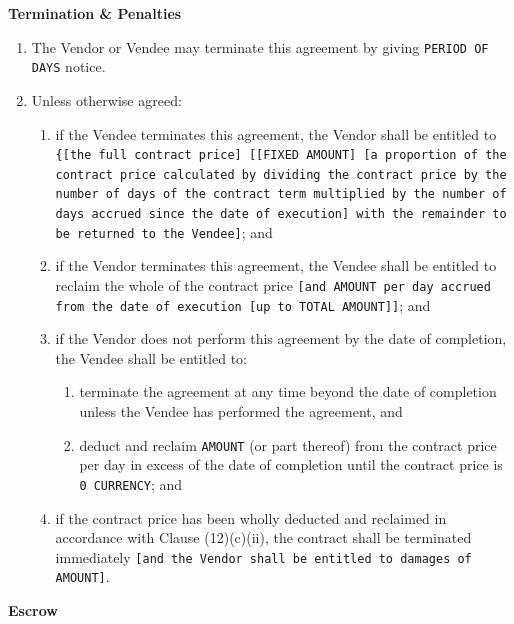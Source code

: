 \documentclass[a4paper,12pt]{article}
\begin{document}
\textbf{Termination \& Penalties}

\begin{enumerate}[resume]
	\item The Vendor or Vendee may terminate this agreement by giving \texttt{\colorbox{branding}{PERIOD OF DAYS}} notice.
	\item Unless otherwise agreed:
	\begin{enumerate}
			\item if the Vendee terminates this agreement, the Vendor shall be entitled to \texttt{\{[the full contract price] [[\texttt{\colorbox{branding}{FIXED AMOUNT}}] [a proportion of the contract price calculated by dividing the contract price by the number of days of the contract term multiplied by the number of days accrued since the date of execution] with the remainder to be returned to the Vendee]}; and
			\item if the Vendor terminates this agreement, the Vendee shall be entitled to reclaim the whole of the contract price \texttt{[and \colorbox{branding}{AMOUNT} per day accrued from the date of execution [up to \colorbox{branding}{TOTAL AMOUNT}]]}; and
			\item if the Vendor does not perform this agreement by the date of completion, the Vendee shall be entitled to:
			\begin{enumerate}
					\item terminate the agreement at any time beyond the date of completion unless the Vendee has performed the agreement, and
					\item deduct and reclaim \texttt{\colorbox{branding}{AMOUNT}} (or part thereof) from the contract price per day in excess of the date of completion until the contract price is \texttt{\colorbox{branding}{0 CURRENCY}}; and
			\end{enumerate}
			\item if the contract price has been wholly deducted and reclaimed in accordance with Clause (12)(c)(ii), the contract shall be terminated immediately \texttt{[and the Vendor shall be entitled to damages of \colorbox{branding}{AMOUNT}]}.
		\end{enumerate}
\end{enumerate}

\textbf{Escrow}
\end{document}
